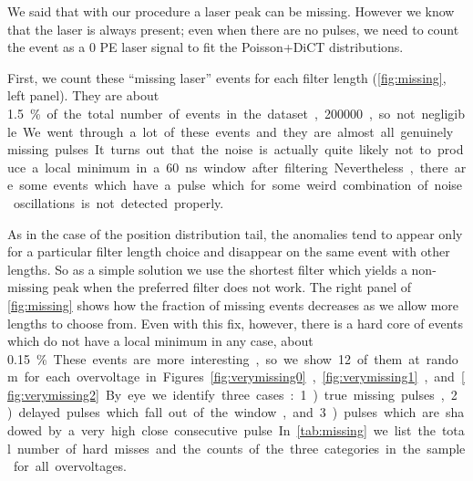 We said that with our procedure a laser peak can be missing. However we know
that the laser is always present; even when there are no pulses, we need to
count the event as a 0 PE laser signal to fit the Poisson+DiCT distributions.


First, we count these ``missing laser'' events for each filter length
(\autoref{fig:missing}, left panel). They are about \SI{1.5}\% of the total
number of events in the dataset, \num{200000}, so not negligible. We went
through a lot of these events and they are almost all genuinely missing pulses.
It turns out that the noise is actually quite likely not to produce a local
minimum in a \SI{60}{ns} window after filtering. Nevertheless, there are some
events which have a pulse which for some weird combination of noise
oscillations is not detected properly.

\begin{figure}

    

\end{figure}

As in the case of the position distribution tail, the anomalies tend to appear
only for a particular filter length choice and disappear on the same event with
other lengths. So as a simple solution we use the shortest filter which yields
a non-missing peak when the preferred filter does not work. The right panel of
\autoref{fig:missing} shows how the fraction of missing events decreases as we
allow more lengths to choose from. Even with this fix, however, there is a hard
core of events which do not have a local minimum in any case, about \SI{0.15}\%.

These events are more interesting, so we show 12 of them at random for each
overvoltage in Figures~\ref{fig:verymissing0}, \ref{fig:verymissing1},
and~\ref{fig:verymissing2}. By eye we identify three cases: 1)~true missing
pulses, 2)~delayed pulses which fall out of the window, and 3)~pulses which are
shadowed by a very high close consecutive pulse. In \autoref{tab:missing} we
list the total number of hard misses and the counts of the three categories in
the sample for all overvoltages.

